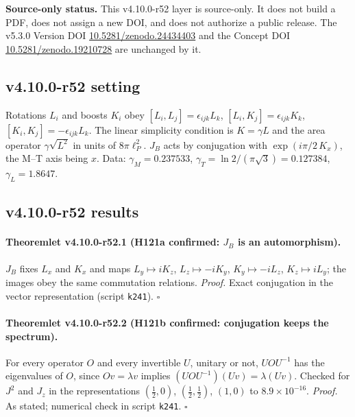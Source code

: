 \noindent\textbf{Source-only status.}
This v4.10.0-r52 layer is source-only.  It does not build a PDF, does not assign a new DOI,
and does not authorize a public release.  The v5.3.0 Version DOI
\href{https://doi.org/10.5281/zenodo.24434403}{10.5281/zenodo.24434403} and the Concept DOI
\href{https://doi.org/10.5281/zenodo.19210728}{10.5281/zenodo.19210728} are unchanged by it.

\subsection*{v4.10.0-r52 setting}
\label{subsec:v4100-r52-setting}

Rotations \(L_i\) and boosts \(K_i\) obey \([L_i,L_j]=\epsilon_{ijk}L_k\), \([L_i,K_j]=\epsilon_{ijk}K_k\), \([K_i,K_j]=-\epsilon_{ijk}L_k\).  The linear simplicity condition is \(K=\gamma L\) and the area
operator \(\gamma\sqrt{L^2}\) in units of \(8\pi\ell_P^2\).  \(J_B\) acts by conjugation with \(\exp(i\pi/2\,K_x)\), the M--T axis being \(x\).  Data: \(\gamma_M=0.237533\), \(\gamma_T=\ln2/(\pi\sqrt3)=0.127384\),
\(\gamma_L=1.8647\).

\subsection*{v4.10.0-r52 results}
\label{subsec:v4100-r52-results}

\paragraph{Theoremlet v4.10.0-r52.1 (H121a confirmed: \(J_B\) is an automorphism).}
\(J_B\) fixes \(L_x\) and \(K_x\) and maps \(L_y\mapsto iK_z\), \(L_z\mapsto-iK_y\), \(K_y\mapsto-iL_z\), \(K_z\mapsto iL_y\); the images obey the same commutation relations.
\emph{Proof.} Exact conjugation in the vector representation (script \texttt{k241}).  \(\square\)

\paragraph{Theoremlet v4.10.0-r52.2 (H121b confirmed: conjugation keeps the spectrum).}
For every operator \(O\) and every invertible \(U\), unitary or not, \(UOU^{-1}\) has the eigenvalues of \(O\), since \(Ov=\lambda v\) implies \((UOU^{-1})(Uv)=\lambda(Uv)\).  Checked for \(J^2\) and
\(J_z\) in the representations \((\tfrac12,0)\), \((\tfrac12,\tfrac12)\), \((1,0)\) to \(8.9\times10^{-16}\).
\emph{Proof.} As stated; numerical check in script \texttt{k241}.  \(\square\)

